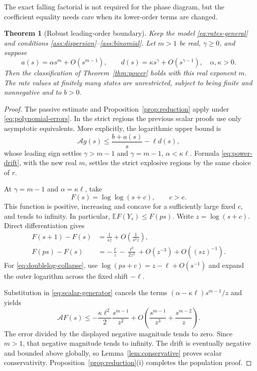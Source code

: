 \documentclass[11pt,a4paper]{article}
\newtheorem{theorem}{Theorem}
\theoremstyle{remark}\newtheorem{remark}[theorem]{Remark}
\newcommand{\E}{\mathbb E}
\newcommand{\A}{\mathcal A}
\begin{document}
The exact falling factorial is not required for the phase diagram, but the coefficient equality needs care when its lower-order terms are changed.

\begin{theorem}[Robust leading-order boundary]\label{thm:robust}
Keep the model \eqref{eq:rates-general} and conditions \ref{ass:dispersion}--\ref{ass:binomial}. Let $m>1$ be real, $\gamma\ge0$, and suppose
\begin{equation}\label{eq:polynomial-errors}
a(s)=\alpha s^m+O(s^{m-1}),\qquad
d(s)=\kappa s^\gamma+O(s^{\gamma-1}),
\quad \alpha,\kappa>0.
\end{equation}
Then the classification of Theorem~\ref{thm:power} holds with this real exponent $m$. The rate values at finitely many states are unrestricted, subject to being finite and nonnegative and to $b>0$.
\end{theorem}
\begin{proof}
The passive estimate and Proposition~\ref{prop:reduction} apply under \eqref{eq:polynomial-errors}. In the strict regions the previous scalar proofs use only asymptotic equivalents. More explicitly, the logarithmic upper bound is
\[
\A g(s)\le\frac{b+a(s)}s-\ell d(s),
\]
whose leading sign settles $\gamma>m-1$ and $\gamma=m-1$, $\alpha<\kappa\ell$. Formula \eqref{eq:power-drift}, with the new real $m$, settles the strict explosive regions by the same choice of $r$.

At $\gamma=m-1$ and $\alpha=\kappa\ell$, take
\[
F(s)=\log\log(s+c),\qquad c>e.
\]
This function is positive, increasing and concave for a sufficiently large fixed $c$, and tends to infinity. In particular,
$\E F(Y_s)\le F(ps)$. Write $z=\log(s+c)$. Direct differentiation gives
\begin{align}
F(s+1)-F(s)&=\frac1{sz}+O\!\left(\frac1{s^2z}\right),\label{eq:doublelog-birth}\\
F(ps)-F(s)&=-\frac{\ell}{z}-\frac{\ell^2}{2z^2}
 +O(z^{-3})+O((sz)^{-1}).\label{eq:doublelog-collapse}
\end{align}
For \eqref{eq:doublelog-collapse}, use
$\log(ps+c)=z-\ell+O(s^{-1})$ and expand the outer logarithm across the fixed shift $-\ell$.

Substitution in \eqref{eq:scalar-generator} cancels the terms
$(\alpha-\kappa\ell)s^{m-1}/z$ and yields
\begin{equation}\label{eq:robust-critical}
\A F(s)\le
-\frac{\kappa\ell^2}{2}\frac{s^{m-1}}{z^2}
+O\!\left(\frac{s^{m-1}}{z^3}+\frac{s^{m-2}}z\right).
\end{equation}
The error divided by the displayed negative magnitude tends to zero. Since $m>1$, that negative magnitude tends to infinity. The drift is eventually negative and bounded above globally, so Lemma~\ref{lem:conservative} proves scalar conservativity. Proposition~\ref{prop:reduction}(i) completes the population proof.
\end{proof}
\end{document}
